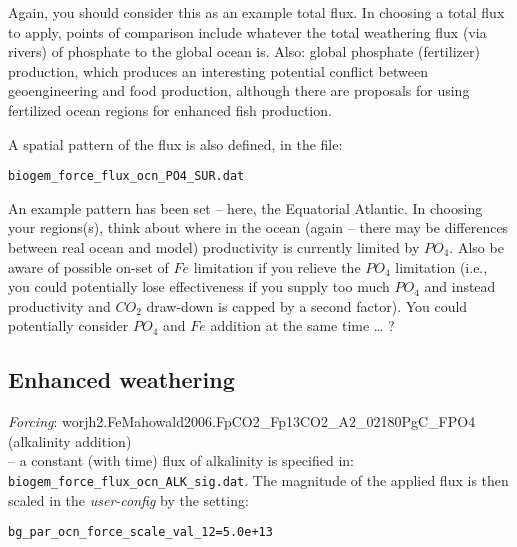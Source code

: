Again, you should consider this as an example total flux. In choosing a total flux to apply, points of comparison include whatever the total weathering flux (via rivers) of phosphate to the global ocean is. Also: global phosphate (fertilizer) production, which produces an interesting potential conflict between geoengineering and food production, although there are proposals for using fertilized ocean regions for enhanced fish production.

\vspace{1mm}
A spatial pattern of the flux is also defined, in the file:
\vspace{-2mm}\small\begin{verbatim}
biogem_force_flux_ocn_PO4_SUR.dat
\end{verbatim}\normalsize\vspace{-2mm}

An example pattern has been set – here, the Equatorial Atlantic. In choosing your regions(s), think about where in the ocean (again – there may be differences between real ocean and model) productivity is currently limited by \(PO_{4}\). Also be aware of possible on-set of \(Fe\) limitation if you relieve the  \(PO_{4}\) limitation (i.e., you could potentially lose effectiveness if you supply too much  \(PO_{4}\) and instead productivity and \(CO_{2}\) draw-down is capped by a second factor). You could potentially consider  \(PO_{4}\) and \(Fe\) addition at the same time … ?


\subsection{Enhanced weathering}

\vspace{2mm}
\textit{Forcing}: \textsf{\footnotesize worjh2.FeMahowald2006.FpCO2\_Fp13CO2\_A2\_02180PgC\_FPO4} (alkalinity addition)
\vspace{1mm}
\\ -- a constant (with time) flux of alkalinity is specified in: \texttt{biogem\_force\_flux\_ocn\_ALK\_sig.dat}. The magnitude of the applied flux is then scaled in the \textit{user-config} by the setting:
\vspace{-2mm}\small\begin{verbatim}
bg_par_ocn_force_scale_val_12=5.0e+13
\end{verbatim}\normalsize\vspace{-2mm}

